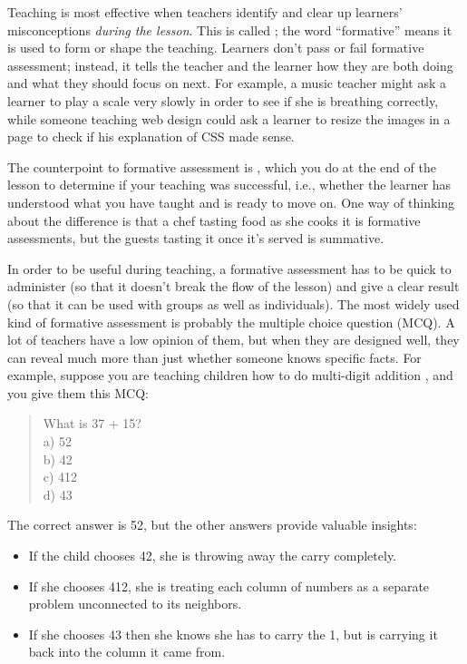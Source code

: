 Teaching is most effective when teachers identify and clear up
learners' misconceptions \emph{during the lesson}.  This is called
; the word
``formative'' means it is used to form or shape the teaching.
Learners don't pass or fail formative assessment; instead, it tells
the teacher and the learner how they are both doing and what they
should focus on next. For example, a music teacher might ask a learner
to play a scale very slowly in order to see if she is breathing
correctly, while someone teaching web design could ask a learner to
resize the images in a page to check if his explanation of CSS made
sense.

The counterpoint to formative assessment is
, which you do
at the end of the lesson to determine if your teaching was successful,
i.e., whether the learner has understood what you have taught and is
ready to move on.  One way of thinking about the difference is that a
chef tasting food as she cooks it is formative assessments, but the
guests tasting it once it's served is summative.

In order to be useful during teaching, a formative assessment has to
be quick to administer (so that it doesn't break the flow of the
lesson) and give a clear result (so that it can be used with groups as
well as individuals). The most widely used kind of formative
assessment is probably the multiple choice question (MCQ).  A lot of
teachers have a low opinion of them, but when they are designed well,
they can reveal much more than just whether someone knows specific
facts.  For example, suppose you are teaching children how to do
multi-digit addition \cite{Ojos2015}, and you give them this MCQ:

\begin{quote}

  What is 37 + 15? \\
  a) 52 \\
  b) 42 \\
  c) 412 \\
  d) 43

\end{quote}

\noindent
The correct answer is 52, but the other answers provide valuable
insights:

\begin{itemize}

\item
  If the child chooses 42, she is throwing away the carry completely.

\item
  If she chooses 412, she is treating each column of numbers as a
  separate problem unconnected to its neighbors.

\item
  If she chooses 43 then she knows she has to carry the 1, but is
  carrying it back into the column it came from.

\end{itemize}

